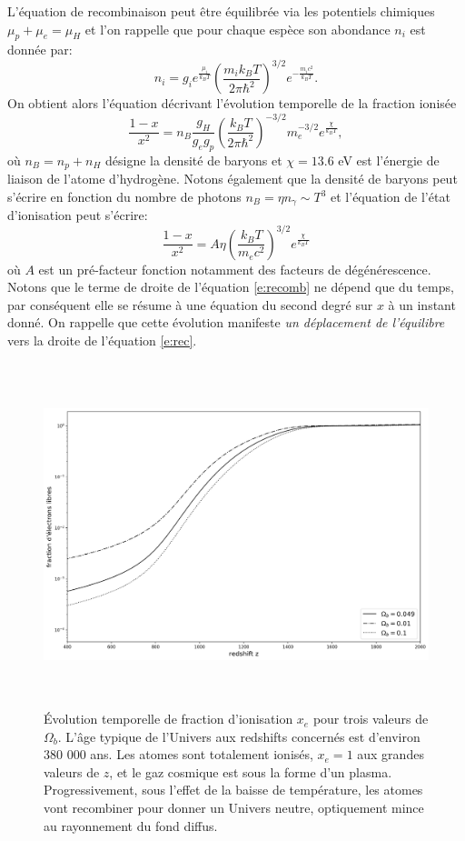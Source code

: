 L'équation de recombinaison peut être équilibrée via les potentiels chimiques $\mu_p+ \mu_e =\mu_H$ et l’on rappelle que pour chaque espèce son abondance $n_i$ est donnée par:
\begin{equation}
n_i=g_ie^{\frac{\mu_i}{k_BT}}\left(\frac{m_i k_B T}{2\pi\hbar^2}\right)^{3/2}e^{-\frac{m_i c^2}{k_B T}}.
\end{equation}
On obtient alors l'équation décrivant l'évolution temporelle de la fraction ionisée 
\begin{equation}
\frac{1-x}{x^2}=n_B \frac{g_H}{g_e g_p} \left(\frac{k_B T}{2\pi\hbar^2}\right)^{-3/2} m_e^{-3/2} e^{\frac{\chi}{k_B T}},
\end{equation}
où $n_B=n_p + n_H$ désigne la densité de baryons et $\chi=13.6$ eV est l'énergie de liaison de l'atome d'hydrogène. Notons également que la densité de baryons peut s'écrire en fonction du nombre de photons $n_B=\eta n_\gamma\sim T^3$ et l'équation de l'état d'ionisation peut s'écrire:
\begin{equation}
\frac{1-x}{x^2}=A \eta \left(\frac{k_B T}{m_e c^2}\right)^{3/2}e^{\frac{\chi}{k_B T}}
\label{e:recomb}
\end{equation}
où $A$ est un pré-facteur fonction notamment des facteurs de dégénérescence. Notons que le terme de droite de l'équation \ref{e:recomb} ne dépend que du temps, par conséquent elle se résume à une équation du second degré sur $x$ à un instant donné. On rappelle que cette évolution manifeste \textit{un déplacement de l'équilibre} vers  la droite de l'équation \ref{e:rec}.
\begin{figure}[htbp]
	\centering
		\includegraphics[height=10cm]{figs/recom.png}
		\caption[Évolution temporelle de fraction d'ionisation]{Évolution temporelle de fraction d'ionisation $x_e$ pour trois valeurs de $\Omega_b$. L'âge typique de l'Univers aux redshifts concernés est d'environ 380 000 ans. Les atomes sont totalement ionisés, $x_e=1$ aux grandes valeurs de $z$, et le gaz cosmique est sous la forme d'un plasma. Progressivement, sous l'effet de la baisse de température, les atomes vont recombiner pour donner un Univers neutre, optiquement mince au rayonnement du fond diffus.}
	\label{f:recomb}
\end{figure}

